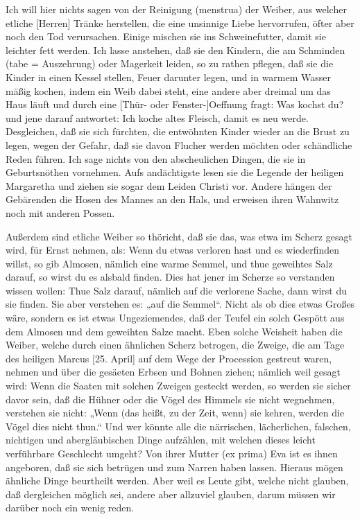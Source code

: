 Ich will hier nichts sagen von der Reinigung (menstrua) der Weiber, aus welcher etliche [Herren] Tränke herstellen, die eine unsinnige Liebe hervorrufen, öfter aber noch den Tod verursachen. Einige mischen sie ins Schweinefutter, damit sie leichter fett werden. Ich lasse anstehen, daß sie den Kindern, die am Schminden (tabe = Auszehrung) oder Magerkeit leiden, so zu rathen pflegen, daß sie die Kinder in einen Kessel stellen, Feuer darunter legen, und in warmem Wasser mäßig kochen, indem ein Weib dabei steht, eine andere aber dreimal um das Haus läuft und durch eine [Thür- oder Fenster-]Oeffnung fragt: Was kochst du? und jene darauf antwortet: Ich koche altes Fleisch, damit es neu werde. Desgleichen, daß sie sich fürchten, die entwöhnten Kinder wieder an die Brust zu legen, wegen der Gefahr, daß sie davon Flucher werden möchten oder schändliche Reden führen. Ich sage nichts von den abscheulichen Dingen, die sie in Geburtsnöthen vornehmen. Aufs andächtigste lesen sie die Legende der heiligen Margaretha und ziehen sie sogar dem Leiden Christi vor. Andere hängen der Gebärenden die Hosen des Mannes an den Hals, und erweisen ihren Wahnwitz noch mit anderen Possen.

Außerdem sind etliche Weiber so thöricht, daß sie das, was etwa im Scherz gesagt wird, für Ernst nehmen, als: Wenn du etwas verloren hast und es wiederfinden willst, so gib Almosen, nämlich eine warme Semmel, und thue geweihtes Salz darauf, so wirst du es alsbald finden. Dies hat jener im Scherze so verstanden wissen wollen: Thue Salz darauf, nämlich auf die verlorene Sache, dann wirst du sie finden. Sie aber verstehen es: „auf die Semmel“. Nicht als ob dies etwas Großes wäre, sondern es ist etwas Ungeziemendes, daß der Teufel ein solch Gespött aus dem Almosen und dem geweihten Salze macht. Eben solche Weisheit haben die
Weiber, welche durch einen ähnlichen Scherz betrogen, die Zweige, die am Tage des heiligen Marcus [25. April] auf dem Wege der Procession gestreut waren, nehmen und über die gesäeten Erbsen und Bohnen ziehen; nämlich weil gesagt wird: Wenn die Saaten mit solchen Zweigen gesteckt werden, so werden sie sicher davor sein, daß die Hühner oder die Vögel des Himmels sie nicht wegnehmen, verstehen sie nicht: „Wenn (das heißt, zu der Zeit, wenn) sie kehren, werden die Vögel dies nicht thun.“ Und wer könnte alle die närrischen, lächerlichen, falschen, nichtigen und abergläubischen Dinge aufzählen, mit welchen dieses leicht verführbare Geschlecht umgeht? Von ihrer Mutter (ex prima) Eva ist es ihnen angeboren, daß sie sich betrügen und zum Narren haben lassen. Hieraus mögen ähnliche Dinge beurtheilt werden. Aber weil es Leute gibt, welche nicht glauben, daß dergleichen möglich sei, andere aber allzuviel glauben, darum müssen wir darüber noch ein wenig reden.

